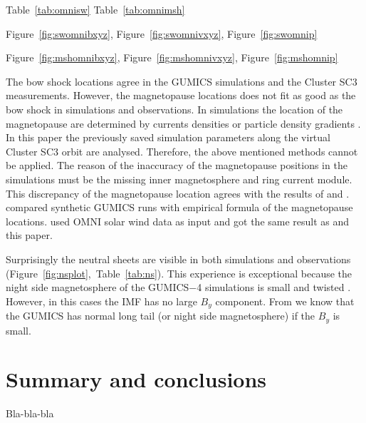 \documentclass[linenumbers,draft]{agujournal}
\begin{document}
Table~\ref{tab:omnisw} Table~\ref{tab:omnimsh}

Figure~\ref{fig:swomnibxyz}, Figure~\ref{fig:swomnivxyz}, Figure~\ref{fig:swomnip}

Figure~\ref{fig:mshomnibxyz}, Figure~\ref{fig:mshomnivxyz}, Figure~\ref{fig:mshomnip}


The bow shock locations agree in the GUMICS simulations and the Cluster SC3 measurements. However, the magnetopause locations does not fit as good as the bow shock in simulations and observations. In simulations the location of the magnetopause are determined by currents densities or particle density gradients \citep[][see references therein]{garcia07:_findin_lyon_fedder_mobar,gordeev13:_verif_gumic_mhd}. In this paper the previously saved simulation parameters along the virtual Cluster SC3 orbit are analysed. Therefore, the above mentioned methods cannot be applied. The reason of the inaccuracy of the magnetopause positions in the simulations must be the missing inner magnetosphere and ring current module. This discrepancy of the magnetopause location agrees with the results of \citet{gordeev13:_verif_gumic_mhd} and \citet{facsko16:_one_earth}. \citet{gordeev13:_verif_gumic_mhd} compared synthetic GUMICS runs with empirical formula of the magnetopause locations. \citet{facsko16:_one_earth} used OMNI solar wind data as input and got the same result as \citet{gordeev13:_verif_gumic_mhd} and this paper.

Surprisingly the neutral sheets are visible in both simulations and observations (Figure~\ref{fig:nsplot},~Table~\ref{tab:ns}). This experience is exceptional because the night side magnetosphere of the GUMICS$-$4 simulations is small and twisted \citep{gordeev13:_verif_gumic_mhd,facsko16:_one_earth}. However, in this cases the IMF has no large $B_{y}$ component. From \citet{facsko16:_one_earth} we know that the GUMICS has normal long tail (or night side magnetosphere) if the $B_{y}$ is small.

\section{Summary and conclusions}
\label{sec:concl}

Bla-bla-bla
\end{document}
